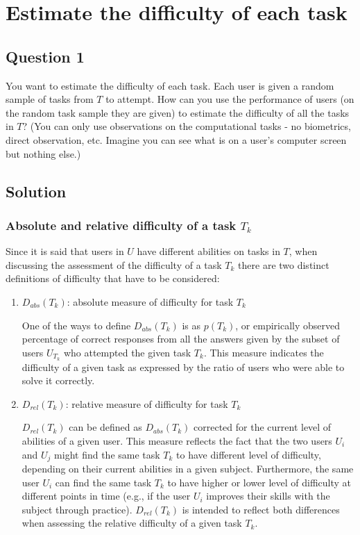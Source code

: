 \chapter{Estimate the difficulty of each task} \label{ch:q1_difficulty}

\section{Question 1} \label{sec:q1}

You want to estimate the difficulty of each task.
Each user is given a random sample of tasks from $T$ to attempt.
How can you use the performance of users (on the random task sample they are given) to estimate the difficulty of all the tasks in $T$?
(You can only use observations on the computational tasks - no biometrics, direct observation, etc.
Imagine you can see what is on a user's computer screen but nothing else.)

\section{Solution} \label{sec:q1_solution}

\subsection{Absolute and relative difficulty of a task $T_k$} \label{subsec:q1_abs_rel_difficulty}

Since it is said that users in $U$ have different abilities on tasks in $T$, when discussing the assessment of the difficulty of a task $T_k$ there are two distinct definitions of difficulty that have to be considered:

\begin{enumerate}
    \item $D_{abs}(T_k)$: absolute measure of difficulty for task $T_k$

    One of the ways to define $D_{abs}(T_k)$ is as $p(T_k)$, or empirically observed percentage of correct responses from all the answers given by the subset of users $U_{T_k}$ who attempted the given task $T_k$.
    This measure indicates the difficulty of a given task as expressed by the ratio of users who were able to solve it correctly.

    \item $D_{rel}(T_k)$: relative measure of difficulty for task $T_k$

    $D_{rel}(T_k)$ can be defined as $D_{abs}(T_k)$ corrected for the current level of abilities of a given user.
    This measure reflects the fact that the two users $U_i$ and $U_j$ might find the same task $T_k$ to have different level of difficulty, depending on their current abilities in a given subject.
    Furthermore, the same user $U_i$ can find the same task $T_k$ to have higher or lower level of difficulty at different points in time (e.g., if the user $U_i$ improves their skills with the subject through practice).
    $D_{rel}(T_k)$ is intended to reflect both differences when assessing the relative difficulty of a given task $T_k$.
\end{enumerate}

